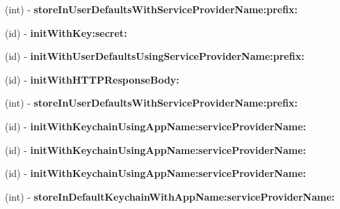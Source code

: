\begin{DoxyCompactItemize}
\item 
\hypertarget{interface_o_a_token_a8de7b89373c093d7302598ee30cb2952}{
(int) -\/ {\bfseries store\-In\-User\-Defaults\-With\-Service\-Provider\-Name\-:prefix\-:}}
\label{interface_o_a_token_a8de7b89373c093d7302598ee30cb2952}

\item 
\hypertarget{interface_o_a_token_abb972888e0d6939fd1b48b0f74ccd997}{
(id) -\/ {\bfseries init\-With\-Key\-:secret\-:}}
\label{interface_o_a_token_abb972888e0d6939fd1b48b0f74ccd997}

\item 
\hypertarget{interface_o_a_token_a362a0c1e64ad62804ce8bdaf6f216bab}{
(id) -\/ {\bfseries init\-With\-User\-Defaults\-Using\-Service\-Provider\-Name\-:prefix\-:}}
\label{interface_o_a_token_a362a0c1e64ad62804ce8bdaf6f216bab}

\item 
\hypertarget{interface_o_a_token_a39bac69d4a054501c43bcbd0001706aa}{
(id) -\/ {\bfseries init\-With\-H\-T\-T\-P\-Response\-Body\-:}}
\label{interface_o_a_token_a39bac69d4a054501c43bcbd0001706aa}

\item 
\hypertarget{interface_o_a_token_a8de7b89373c093d7302598ee30cb2952}{
(int) -\/ {\bfseries store\-In\-User\-Defaults\-With\-Service\-Provider\-Name\-:prefix\-:}}
\label{interface_o_a_token_a8de7b89373c093d7302598ee30cb2952}

\item 
\hypertarget{interface_o_a_token_a22a540e3ab30128a5da54ee39b7d3af6}{
(id) -\/ {\bfseries init\-With\-Keychain\-Using\-App\-Name\-:service\-Provider\-Name\-:}}
\label{interface_o_a_token_a22a540e3ab30128a5da54ee39b7d3af6}

\item 
\hypertarget{interface_o_a_token_a22a540e3ab30128a5da54ee39b7d3af6}{
(id) -\/ {\bfseries init\-With\-Keychain\-Using\-App\-Name\-:service\-Provider\-Name\-:}}
\label{interface_o_a_token_a22a540e3ab30128a5da54ee39b7d3af6}

\item 
\hypertarget{interface_o_a_token_a22a540e3ab30128a5da54ee39b7d3af6}{
(id) -\/ {\bfseries init\-With\-Keychain\-Using\-App\-Name\-:service\-Provider\-Name\-:}}
\label{interface_o_a_token_a22a540e3ab30128a5da54ee39b7d3af6}

\item 
\hypertarget{interface_o_a_token_a3677526ece157e96975aa0a5910bf980}{
(int) -\/ {\bfseries store\-In\-Default\-Keychain\-With\-App\-Name\-:service\-Provider\-Name\-:}}
\label{interface_o_a_token_a3677526ece157e96975aa0a5910bf980}


\end{DoxyCompactItemize}
